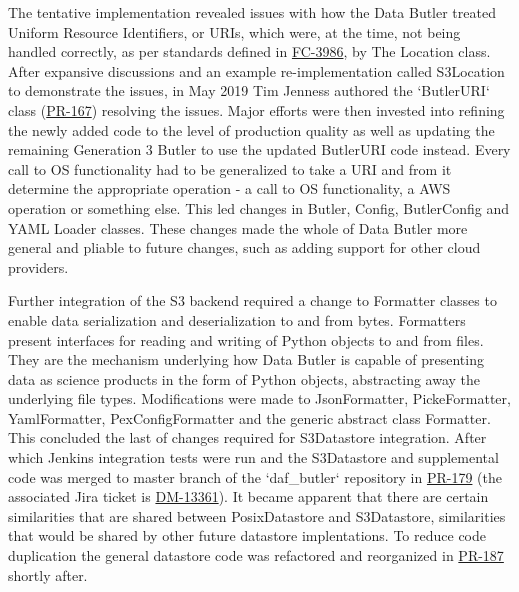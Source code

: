 The tentative implementation revealed issues with how the Data Butler treated Uniform Resource Identifiers, or URIs, which were, at the time, not being handled correctly, as per standards defined in \href{https://tools.ietf.org/html/rfc3986}{FC-3986}, by The Location class. After expansive discussions and an example re-implementation called S3Location to demonstrate the issues, in May 2019 Tim Jenness authored the `ButlerURI` class (\href{https://github.com/lsst/daf_butler/pull/167}{PR-167}) resolving the issues. Major efforts were then invested into refining the newly added code to the level of production quality as well as updating the remaining Generation 3 Butler to use the updated ButlerURI code instead. Every call to OS functionality had to be generalized to take a URI and from it determine the appropriate operation - a call to OS functionality, a AWS operation or something else. This led changes in Butler, Config, ButlerConfig and YAML Loader classes. These changes made the whole of Data Butler more general and pliable to future changes, such as adding support for other cloud providers. 

Further integration of the S3 backend required a change to Formatter classes to enable data serialization and deserialization to and from bytes. Formatters present interfaces for reading and writing of Python objects to and from files. They are the mechanism underlying how Data Butler is capable of presenting data as science products in the form of Python objects, abstracting away the underlying file types. Modifications were made to JsonFormatter, PickeFormatter, YamlFormatter, PexConfigFormatter and the generic abstract class Formatter. This concluded the last of changes required for S3Datastore integration. After which Jenkins integration tests were run and the S3Datastore and supplemental code was merged to master branch of the `daf\_butler` repository in \href{https://github.com/lsst/daf_butler/pull/179}{PR-179} (the associated Jira ticket is \href{https://jira.lsstcorp.org/browse/DM-13361}{DM-13361}). It became apparent that there are certain similarities that are shared between PosixDatastore and S3Datastore, similarities that would be shared by other future datastore implentations. To reduce code duplication the general datastore code was refactored and reorganized in \href{https://github.com/lsst/daf_butler/pull/187}{PR-187} shortly after. 

